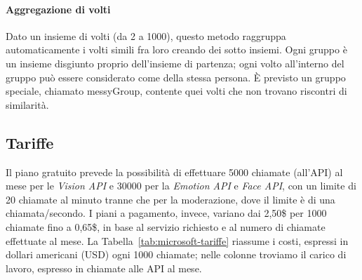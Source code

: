 \paragraph{Aggregazione di volti} Dato un insieme di volti (da 2 a 1000), questo metodo raggruppa automaticamente i volti simili fra loro creando dei sotto insiemi.
Ogni gruppo è un insieme disgiunto proprio dell'insieme di partenza; ogni volto all'interno del gruppo può essere considerato come della stessa persona.
È previsto un gruppo speciale, chiamato \textsf{messyGroup}, contente quei volti che non trovano riscontri di similarità.
%
\subsection{Tariffe}
Il piano gratuito prevede la possibilità di effettuare 5000 chiamate (all'API) al mese per le \textit{Vision API} e 30000 per la \textit{Emotion API} e \textit{Face API}, con un limite di 20 chiamate al minuto tranne che per la moderazione, dove il limite è di una chiamata/secondo.
I piani a pagamento, invece, variano dai 2,50\$ per 1000 chiamate fino a 0,65\$, in base al servizio richiesto e al numero di chiamate effettuate al mese.
La Tabella~\ref{tab:microsoft-tariffe} riassume i costi, espressi in dollari americani (USD) ogni 1000 chiamate; nelle colonne troviamo il carico di lavoro, espresso in chiamate alle API al mese.

